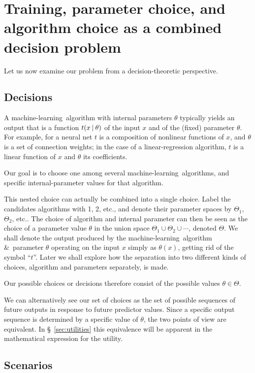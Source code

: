 \documentclass[\ifafour a4paper,12pt,\else a5paper,10pt,\fi%
onecolumn,oneside,article,%
british%
]{memoir}
\theoremstyle{remark}
\theoremstyle{innote}
\newcommand*{\amp}{\&}
\renewcommand*{\|}[1][]{\nonscript\:#1\vert\nonscript\:\mathopen{}}
\newcommand*{\sect}{\S}%
\newcommand*{\etc}{{etc.}}
\newcommand*{\ml}{machine-learning}
\begin{document}
\section{Training, parameter choice, and algorithm choice as a combined
  decision problem}
\label{sec:training_as_decision}

Let us now examine our problem from a decision-theoretic perspective.

\subsection{Decisions}
\label{sec:decisions}

A \ml\ algorithm with internal parameters $\theta$ typically yields an
output that is a function $t(x \| \theta)$ of the input $x$ and of the
(fixed) parameter $\theta$. For example, for a neural net $t$ is a
composition of nonlinear functions of $x$, and $\theta$ is a set of
connection weights; in the case of a linear-regression algorithm, $t$ is a
linear function of $x$ and $\theta$ its coefficients.

Our goal is to choose one among several \ml\ algorithms, and specific
internal-parameter values for that algorithm.

This nested choice can actually be combined into a single choice. Label the
candidates algorithms with 1, 2, \etc, and denote their parameter spaces by
$\varTheta_{1}$, $\varTheta_{2}$, \etc. The choice of algorithm and
internal parameter can then be seen as the choice of a parameter value
$\theta$ in the union space $\varTheta_{1} \cup \varTheta_{2} \cup\dotsb$,
denoted $\varTheta$. We shall denote the output produced by the \ml\
algorithm \amp\ parameter $\theta$ operating on the input $x$ simply as
$\theta(x)$, getting rid of the symbol \enquote{$t$}. Later we shall
explore how the separation into two different kinds of choices, algorithm
and parameters separately, is made.

Our possible choices or decisions therefore consist of the possible values
$\theta \in \varTheta$.

We can alternatively see our set of choices as the set of possible
sequences of future outputs in response to future predictor values.
Since a specific output sequence is determined by a specific value of
$\theta$, the two points of view are equivalent. In
\sect~\ref{sec:utilities} this equivalence will be apparent in the
mathematical expression for the utility.

\subsection{Scenarios}
\label{sec:scenarios}
\end{document}
